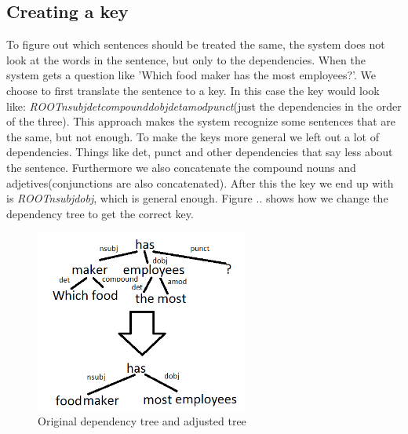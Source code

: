 \documentclass{article}
\begin{document}
\subsection*{Creating a key}
To figure out which sentences should be treated the same, the system does not look at the words in the sentence, but only to the dependencies. When the system gets a question like 'Which food maker has the most employees?'. We choose to first translate the sentence to a key. In this case the key would look like: \textit{ROOTnsubjdetcompounddobjdetamodpunct}(just the dependencies in the order of the three). This approach makes the system recognize some sentences that are the same, but not enough. To make the keys more general we left out a lot of dependencies. Things like det, punct and other dependencies that say less about the sentence. Furthermore we also concatenate the compound nouns and adjetives(conjunctions are also concatenated). After this the key we end up with is \textit{ROOTnsubjdobj}, which is general enough. Figure .. shows how we change the dependency tree to get the correct key. 
\begin{figure}[!ht]
    \centering
        \includegraphics[width=7cm]{secondtree}
    \caption{Original dependency tree and adjusted tree}
    \label{fig:afb5}
\end{figure}
\end{document}
